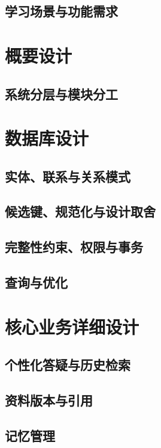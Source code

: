 \documentclass[12pt,hyperref,a4paper,UTF8]{ctexart}
\begin{document}
\subsection{学习场景与功能需求}


\section{概要设计}

\subsection{系统分层与模块分工}


\section{数据库设计}

\subsection{实体、联系与关系模式}

\subsection{候选键、规范化与设计取舍}

\subsection{完整性约束、权限与事务}

\subsection{查询与优化}


\section{核心业务详细设计}

\subsection{个性化答疑与历史检索}

\subsection{资料版本与引用}

\subsection{记忆管理}
\end{document}
